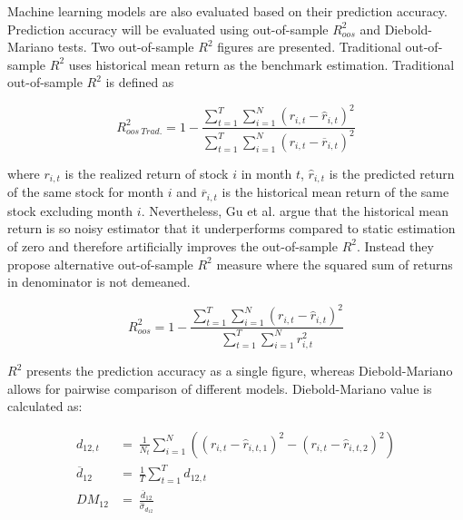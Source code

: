 \documentclass{article}
\begin{document}

Machine learning models are also evaluated based on their prediction accuracy. Prediction accuracy will be evaluated using out-of-sample $R^{2}_{oos}$ and Diebold-Mariano tests. Two out-of-sample $R^{2}$ figures are presented. Traditional out-of-sample $R^{2}$ uses historical mean  return as the benchmark estimation. Traditional out-of-sample $R^{2}$ is defined as

\begin{equation}
\label{eq:r2Trad}
R^{2}_{oos \ Trad.} = 1 - \frac{\sum^T_{t=1} \sum^N_{i=1} (r_{i, t} - \hat r_{i, t})^2}{ \sum^T_{t=1} \sum^N_{i=1} (r_{i, t} - \overline{r}_{i, t} )^2}
\end{equation}

where $r_{i, t}$ is the realized return of stock $i$ in month $t$, $\hat r_{i, t}$ is the predicted return of the same stock for month $i$ and $\overline{r}_{i, t}$ is the historical mean return of the same stock excluding month $i$. Nevertheless, Gu et al. \citeyear{guetal} argue that the historical mean return is so noisy estimator that it underperforms compared to static estimation of zero and therefore artificially improves the out-of-sample $R^{2}$. Instead they propose alternative out-of-sample $R^{2}$ measure where the squared sum of returns in denominator is not demeaned. 

\begin{equation}
\label{eq:r2}
R^{2}_{oos} = 1 - \frac{\sum^T_{t=1} \sum^N_{i=1} (r_{i, t} - \hat r_{i, t})^2}{ \sum^T_{t=1} \sum^N_{i=1} r^2_{i, t}}
\end{equation}

$R^2$ presents the prediction accuracy as a single figure, whereas Diebold-Mariano allows for pairwise comparison of different models. Diebold-Mariano value is calculated as:

\begin{equation}
\label{eq:Diebold-Mariano}
\begin{split}
 d_{12, t} 			& = \ \frac{1}{N_{t}}  \sum^N_{i=1}((r_{i, t} - \hat r_{i, t, 1})^2 - (r_{i, t} - \hat r_{i, t, 2})^2) \\
\overline{d}_{12} 	& = \ \frac{1}{T} \sum^T_{t=1} d_{12, t} \\
DM_{12} 			& = \ \frac{\overline{d}_{12}}{\hat \sigma_{d_{12}}} \\
\end{split}
\end{equation}
\end{document}
